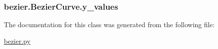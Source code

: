 \subsubsection[{y\+\_\+values}]{\setlength{\rightskip}{0pt plus 5cm}bezier.\+Bezier\+Curve.\+y\+\_\+values}\label{classbezier_1_1_bezier_curve_a8bf9aa7947c5ff98a513b2119c3bebac}


The documentation for this class was generated from the following file\+:\begin{DoxyCompactItemize}
\item 
\hyperlink{bezier_8py}{bezier.\+py}\end{DoxyCompactItemize}
